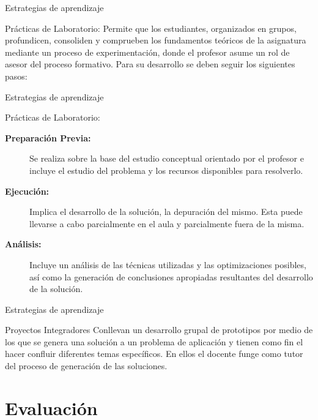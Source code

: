 \documentclass[handout,xcolor=dvipsnames]{beamer}
\newcommand{\pageframe}[1]{\frame{\begin{center}{ \Huge #1 }\end{center}}}
\begin{document}
\begin{frame}{Estrategias de aprendizaje}
  \begin{block}{Prácticas de Laboratorio:}
    Permite que los estudiantes, organizados en grupos, profundicen, consoliden y comprueben los fundamentos teóricos de la asignatura mediante un proceso de experimentación, donde el profesor asume un rol de asesor del proceso formativo. Para su desarrollo se deben seguir los siguientes pasos:
  \end{block}
\end{frame}

\begin{frame}{Estrategias de aprendizaje}
  \begin{block}{Prácticas de Laboratorio:}
    \begin{description}
      \item[\textbf{Preparación Previa:}] Se realiza sobre la base del estudio conceptual orientado por el profesor e incluye el estudio del problema y los recursos disponibles para resolverlo.
      \item[\textbf{Ejecución:}] Implica el desarrollo de la solución, la depuración del mismo. Esta puede llevarse a cabo parcialmente en el aula y parcialmente fuera de la misma.
      \item[\textbf{Análisis:}] Incluye un análisis de las técnicas utilizadas y las optimizaciones posibles, así como la generación de conclusiones apropiadas resultantes del desarrollo de la solución.
    \end{description}
  \end{block}
\end{frame}


\begin{frame}{Estrategias de aprendizaje}
  \begin{block}{Proyectos Integradores}
    Conllevan un desarrollo grupal de prototipos por medio de los que se genera una solución a un problema de aplicación y tienen como fin el hacer confluir diferentes temas específicos. En ellos el docente funge como tutor del proceso de generación de las soluciones.
  \end{block}
\end{frame}

\section{Evaluaci\'on}

\pageframe{Evaluación}
\end{document}
